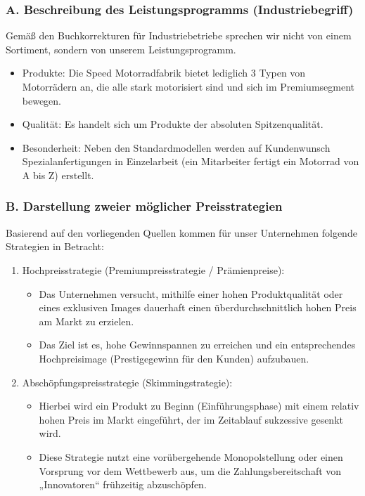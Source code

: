 \documentclass[12pt, a4paper]{article}
\begin{document}
\subsubsection{A. Beschreibung des Leistungsprogramms (Industriebegriff)}
Gemäß den Buchkorrekturen für Industriebetriebe sprechen wir nicht von einem Sortiment, sondern von unserem Leistungsprogramm.
\begin{itemize}
    \item Produkte: Die Speed Motorradfabrik bietet lediglich 3 Typen von Motorrädern an, die alle stark motorisiert sind und sich im Premiumsegment bewegen.
    \item Qualität: Es handelt sich um Produkte der absoluten Spitzenqualität.
    \item Besonderheit: Neben den Standardmodellen werden auf Kundenwunsch Spezialanfertigungen in Einzelarbeit (ein Mitarbeiter fertigt ein Motorrad von A bis Z) erstellt.
\end{itemize}

\subsubsection{B. Darstellung zweier möglicher Preisstrategien}
Basierend auf den vorliegenden Quellen kommen für unser Unternehmen folgende Strategien in Betracht:
\begin{enumerate}
    \item  Hochpreisstrategie (Premiumpreisstrategie / Prämienpreise):
        \begin{itemize}
            \item Das Unternehmen versucht, mithilfe einer hohen Produktqualität oder eines exklusiven Images dauerhaft einen überdurchschnittlich hohen Preis am Markt zu erzielen.
            \item Das Ziel ist es, hohe Gewinnspannen zu erreichen und ein entsprechendes Hochpreisimage (Prestigegewinn für den Kunden) aufzubauen.
        \end{itemize}
    \item Abschöpfungspreisstrategie (Skimmingstrategie):
        \begin{itemize}
            \item Hierbei wird ein Produkt zu Beginn (Einführungsphase) mit einem relativ hohen Preis im Markt eingeführt, der im Zeitablauf sukzessive gesenkt wird.
            \item Diese Strategie nutzt eine vorübergehende Monopolstellung oder einen Vorsprung vor dem Wettbewerb aus, um die Zahlungsbereitschaft von „Innovatoren“ frühzeitig abzuschöpfen.
        \end{itemize}
\end{enumerate}
\end{document}
